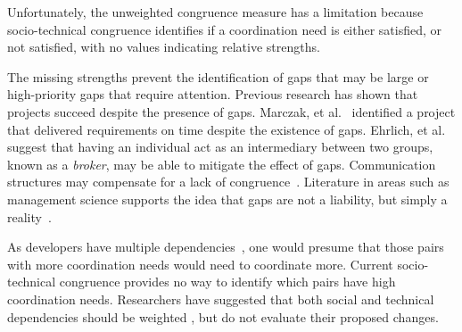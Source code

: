 Unfortunately, the unweighted congruence measure has a limitation because socio-technical congruence identifies if a coordination need is either satisfied, or not satisfied, with no values indicating relative strengths.

The missing strengths prevent the identification of gaps that may be large or high-priority gaps that require attention.  Previous research has shown that projects succeed despite the presence of gaps. Marczak, et al.~\cite{marczak:re:2008} identified a project that delivered requirements on time despite the existence of gaps. 
Ehrlich, et al.~\cite{ehrlich2008:gaps} suggest that having an individual act as an intermediary between two groups, known as a \emph{broker}, may be able to mitigate the effect of gaps.
Communication structures may compensate for a lack of congruence~\cite{hinds:cscw:2006}. Literature in areas such as management science supports the idea that gaps are not a liability, but simply a reality~\cite{deSouza2004:thwarts_collaboration,hossain:cscw:2006}.

As developers have multiple dependencies~\cite{desouza2007:awarenessnetwork,mockus2002:opensource}, one would presume that those pairs with more coordination needs would need to coordinate more. Current socio-technical congruence provides no way to identify which pairs have high coordination needs. Researchers have suggested that both social and technical dependencies should be weighted \cite{valetto:msr:2007,kwan2009:weighted}, 
but do not evaluate their proposed changes.







